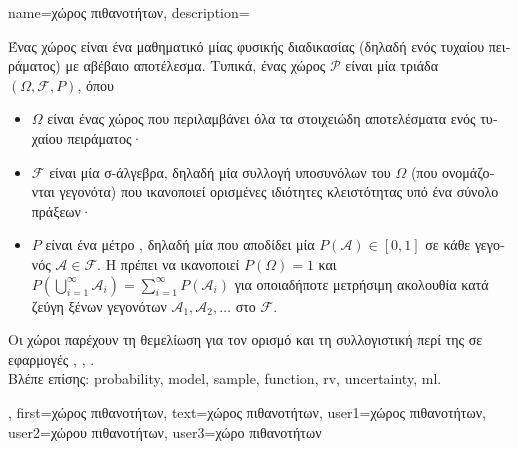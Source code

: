  {name={\foreignlanguage{greek}{χώρος πιθανοτήτων}}, 
 	description={\foreignlanguage{greek}{Ένας χώρος}  
		\foreignlanguage{greek}{είναι ένα μαθηματικό}  \foreignlanguage{greek}{μίας φυσικής διαδικασίας 
		(δηλαδή ενός τυχαίου πειράματος) με αβέβαιο αποτέλεσμα. Τυπικά, ένας χώρος}  
 	   	 $\mathcal{P}$ \foreignlanguage{greek}{είναι μία τριάδα $(\Omega, \mathcal{F}, P)$, όπου}
 		\begin{itemize} 
 			\item  $\Omega$ \foreignlanguage{greek}{είναι ένας}  \foreignlanguage{greek}{χώρος που περιλαμβάνει όλα 
			τα στοιχειώδη αποτελέσματα ενός τυχαίου πειράματος·}
 			\item  $\mathcal{F}$ \foreignlanguage{greek}{είναι μία σ-άλγεβρα, δηλαδή μία συλλογή υποσυνόλων του $\Omega$ (που ονομάζονται 
			γεγονότα) που ικανοποιεί ορισμένες ιδιότητες κλειστότητας υπό ένα σύνολο πράξεων·}
 			\item $P$ \foreignlanguage{greek}{είναι ένα μέτρο} , \foreignlanguage{greek}{δηλαδή μία}  
			\foreignlanguage{greek}{που αποδίδει μία}  $P(\mathcal{A}) \in [0,1]$ 
 			\foreignlanguage{greek}{σε κάθε γεγονός $\mathcal{A} \in \mathcal{F}$. Η}  \foreignlanguage{greek}{πρέπει 
			να ικανοποιεί $P(\Omega) = 1$ και 	$P\left(\bigcup_{i=1}^{\infty} \mathcal{A}_i\right) = \sum_{i=1}^{\infty} P(\mathcal{A}_i)$ για 
			οποιαδήποτε μετρήσιμη ακολουθία κατά ζεύγη ξένων γεγονότων $\mathcal{A}_1, \mathcal{A}_2, \ldots$ στο} $\mathcal{F}$.
 		\end{itemize}
 		\foreignlanguage{greek}{Οι χώροι}  \foreignlanguage{greek}{παρέχουν τη θεμελίωση για τον ορισμό}  
		\foreignlanguage{greek}{και τη συλλογιστική περί της}  \foreignlanguage{greek}{σε εφαρμογές} 
		 \cite{BillingsleyProbMeasure}, \cite{GrayProbBook}, \cite{ross2013first}.\\
		\foreignlanguage{greek}{Βλέπε επίσης:} \gls{probability}, \gls{model}, \gls{sample}, \gls{function}, \gls{rv}, \gls{uncertainty}, \gls{ml}.},  
 	first={\foreignlanguage{greek}{χώρος πιθανοτήτων}}, 
 	text={\foreignlanguage{greek}{χώρος πιθανοτήτων}},
	user1={\foreignlanguage{greek}{χώρος πιθανοτήτων}}, %
  	user2={\foreignlanguage{greek}{χώρου πιθανοτήτων}}, %
	user3={\foreignlanguage{greek}{χώρο πιθανοτήτων}} %
 }

